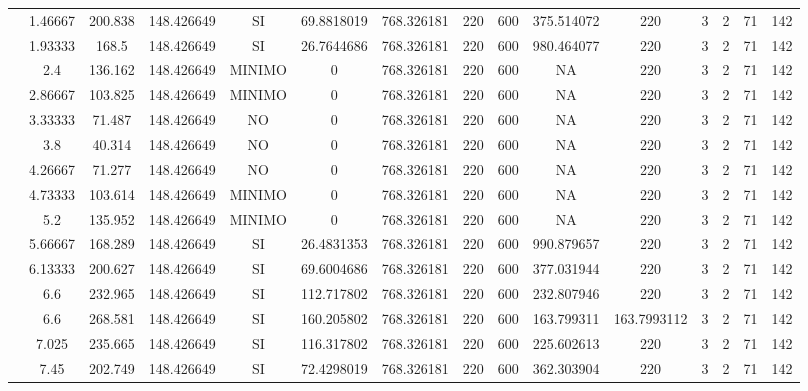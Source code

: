 \begin{table}[H]
{\begin{tabular}{|c|c|c|c|c|c|c|c|c|c|c|c|c|c|c|}
\cline{2-15}    & 1.46667 & 200.838 & 148.426649 & SI  & 69.8818019 & 768.326181 & 220 & 600 & 375.514072 & 220 & 3   & 2   & 71  & 142 \bigstrut\\
\cline{2-15}    & 1.93333 & 168.5 & 148.426649 & SI  & 26.7644686 & 768.326181 & 220 & 600 & 980.464077 & 220 & 3   & 2   & 71  & 142 \bigstrut\\
\cline{2-15}    & 2.4 & 136.162 & 148.426649 & MINIMO & 0   & 768.326181 & 220 & 600 & NA  & 220 & 3   & 2   & 71  & 142 \bigstrut\\
\cline{2-15}    & 2.86667 & 103.825 & 148.426649 & MINIMO & 0   & 768.326181 & 220 & 600 & NA  & 220 & 3   & 2   & 71  & 142 \bigstrut\\
\cline{2-15}    & 3.33333 & 71.487 & 148.426649 & NO  & 0   & 768.326181 & 220 & 600 & NA  & 220 & 3   & 2   & 71  & 142 \bigstrut\\
\cline{2-15}    & 3.8 & 40.314 & 148.426649 & NO  & 0   & 768.326181 & 220 & 600 & NA  & 220 & 3   & 2   & 71  & 142 \bigstrut\\
\cline{2-15}    & 4.26667 & 71.277 & 148.426649 & NO  & 0   & 768.326181 & 220 & 600 & NA  & 220 & 3   & 2   & 71  & 142 \bigstrut\\
\cline{2-15}    & 4.73333 & 103.614 & 148.426649 & MINIMO & 0   & 768.326181 & 220 & 600 & NA  & 220 & 3   & 2   & 71  & 142 \bigstrut\\
\cline{2-15}    & 5.2 & 135.952 & 148.426649 & MINIMO & 0   & 768.326181 & 220 & 600 & NA  & 220 & 3   & 2   & 71  & 142 \bigstrut\\
\cline{2-15}    & 5.66667 & 168.289 & 148.426649 & SI  & 26.4831353 & 768.326181 & 220 & 600 & 990.879657 & 220 & 3   & 2   & 71  & 142 \bigstrut\\
\cline{2-15}    & 6.13333 & 200.627 & 148.426649 & SI  & 69.6004686 & 768.326181 & 220 & 600 & 377.031944 & 220 & 3   & 2   & 71  & 142 \bigstrut\\
\cline{2-15}    & 6.6 & 232.965 & 148.426649 & SI  & 112.717802 & 768.326181 & 220 & 600 & 232.807946 & 220 & 3   & 2   & 71  & 142 \bigstrut\\
\cline{2-15}    & 6.6 & 268.581 & 148.426649 & SI  & 160.205802 & 768.326181 & 220 & 600 & 163.799311 & 163.7993112 & 3   & 2   & 71  & 142 \bigstrut\\
\cline{2-15}    & 7.025 & 235.665 & 148.426649 & SI  & 116.317802 & 768.326181 & 220 & 600 & 225.602613 & 220 & 3   & 2   & 71  & 142 \bigstrut\\
\cline{2-15}    & 7.45 & 202.749 & 148.426649 & SI  & 72.4298019 & 768.326181 & 220 & 600 & 362.303904 & 220 & 3   & 2   & 71  & 142 \bigstrut\\

\end{tabular}}
\end{table}
